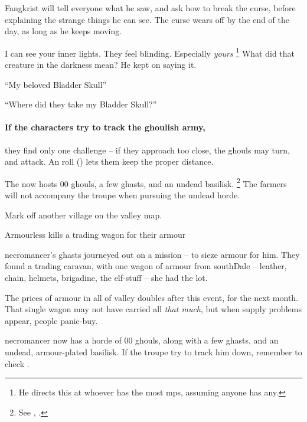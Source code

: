 Fangkrist will tell everyone what he saw, and ask how to break the curse, before explaining the strange things he can see.
The curse wears off by the end of the day, as long as he keeps moving.

\begin{speechtext}
  I can see your inner lights.
  They feel blinding.
  Especially \emph{yours}%
  \footnote{He directs this at whoever has the most \glspl{mp}, assuming anyone has any.}
  What did that creature in the darkness mean?
  He kept on saying it.

  ``My beloved Bladder Skull''

  ``Where did they take my Bladder Skull?''
\end{speechtext}

\paragraph{If the characters try to track the ghoulish army,}
they find only one challenge -- if they approach too close, the ghouls may turn, and attack.
An  roll (\tn[10]) lets them keep the proper distance.

The  now hosts 00 ghouls, a few ghasts, and an undead basilisk.%
\footnote{See , .}
The farmers will not accompany the troupe when pursuing the undead horde.

Mark off another \gls{village} on the \gls{valley} map.


{\squash Armourless}%
{ kills a trading wagon for their armour}%
\label{necroArmour}

\begin{exampletext}
  \Gls{necromancer}'s ghasts journeyed out on a mission -- to sieze armour for him.
  They found a trading caravan, with one wagon of armour from \gls{southDale} -- leather, chain, helmets, brigadine, the elf-stuff -- she had the lot.
\end{exampletext}

The prices of armour in all of \gls{valley} doubles after this event, for the next month.
That single wagon may not have carried all \emph{that much}, but when supply problems appear, people panic-buy.

\Gls{necromancer} now has a horde of 00 ghouls, along with a few ghasts, and an undead, armour-plated basilisk.
If the troupe try to track him down, remember to check .

